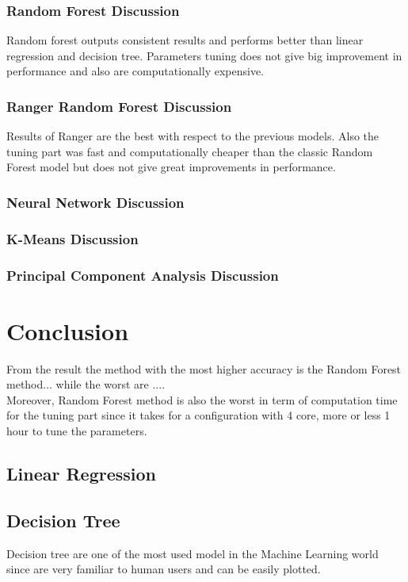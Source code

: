 \documentclass{FR16}
\begin{document}
\subsubsection{Random Forest Discussion}
Random forest outputs consistent results and performs  better than linear regression and decision tree. 
Parameters tuning does not give big improvement in performance and also are computationally expensive.
\\

\subsubsection{Ranger Random Forest Discussion}
Results of Ranger are the best with respect to the previous models. Also the tuning part was fast and computationally cheaper than 
the classic Random Forest model but does not give great improvements in performance.
\\
\subsubsection{Neural Network Discussion}
\subsubsection{K-Means Discussion}
\subsubsection{Principal Component Analysis Discussion}

\section{Conclusion}

From the result the method with the most higher accuracy is the Random Forest method... while the worst are ....
\\Moreover, Random Forest method is also the worst in term of computation time for the tuning part since it takes for a configuration with 4 core, more or less 1 hour to tune the parameters. 

\subsection{Linear Regression}


\subsection{Decision Tree}
Decision  tree are one of the most used model in the Machine Learning world since are very familiar to human users and can be easily plotted. 
\\
\end{document}
